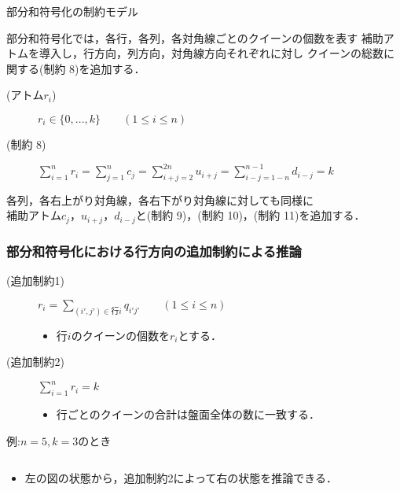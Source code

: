 \begin{frame}{部分和符号化の制約モデル}
 \begin{alertblock}{}
  部分和符号化では，各行，各列，各対角線ごとのクイーンの個数を表す
  補助アトムを導入し，行方向，列方向，対角線方向それぞれに対し
  クイーンの総数に関する(制約 8)を追加する．
 \end{alertblock}
 \begin{block}{}
  \begin{description}
   \item[{\color{black} (アトム$r_{i}$)}] $r_{i} \in \{0,...,k\} \qquad (1 \leq i \leq n)$
   \item[{\color{black} (制約 8)}] $\sum\limits_{i=1}^{n}r_{i} = \sum\limits_{j=1}^{n}c_{j} = \sum\limits_{i+j=2}^{2n}u_{i+j} = \sum\limits_{i-j=1-n}^{n-1}d_{i-j} = k$
  \end{description}
各列，各右上がり対角線，各右下がり対角線に対しても同様に\\
補助アトム$c_j$，$u_{i+j}$，$d_{i-j}$と(制約 9)，(制約 10)，(制約 11)を追加する．
 \end{block}
\end{frame}

\begin{frame}\frametitle{部分和符号化における行方向の追加制約による推論}
 \begin{block}{}
  \begin{description}
   \item[(追加制約1)] $r_{i}=\sum\limits_{(i',j')\in \mbox{行}i} 
	      q_{i'j'} \qquad (1 \leq i \leq n)$ 
	      \begin{itemize}
	       \item 行$i$のクイーンの個数を$r_i$とする．
	      \end{itemize}
   \item[(追加制約2)] $\sum\limits_{i=1}^{n}r_{i} = k$
	      \begin{itemize}
	       \item 行ごとのクイーンの合計は盤面全体の数に一致する．
	      \end{itemize}
  \end{description}
 \end{block}
 \begin{exampleblock}{例:$n=5,k=3$のとき}
  \begin{columns}
   \begin{column}{0.30\textwidth}
    \centering
    
   \end{column}
   \begin{column}{0.30\textwidth}
    \centering
    
   \end{column}
  \end{columns}
  \begin{itemize}
   \item 左の図の状態から，追加制約2によって右の状態を推論できる．
  \end{itemize}
 \end{exampleblock}
\end{frame}

